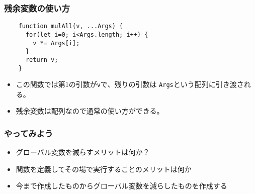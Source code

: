 \begin{frame}[containsverbatim]
 \frametitle{残余変数の使い方}
	\begin{Verbatim}
	function mulAll(v, ...Args) {
	  for(let i=0; i<Args.length; i++) {
	    v *= Args[i];
	  }
	  return v;
	}
	\end{Verbatim}
\begin{itemize}
 \item この関数では第1の引数が\texttt{v}で、残りの引数は
			 \texttt{Args}という配列に引き渡される。
 \item 残余変数は配列なので通常の使い方ができる。
 \end{itemize}
\end{frame}
\begin{frame}[containsverbatim]
 \frametitle{やってみよう}
 \begin{itemize}
	\item グローバル変数を減らすメリットは何か？
	\item 関数を定義してその場で実行することのメリットは何か
	\item 今まで作成したものからグローバル変数を減らしたものを作成する
 \end{itemize}
\end{frame}


\begin{frame}[containsverbatim]
 \frametitle{}
\end{frame}
